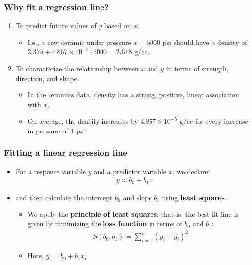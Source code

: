 \documentclass[handout]{beamer}\usepackage[]{graphicx}\usepackage[]{color}
\providecommand{\wh}[1]{\widehat{#1}}
\numberwithin{equation}{section}
\begin{document}
\begin{frame}
\frametitle{Why fit a regression line?}
\begin{enumerate}[1. ]
\item To predict future values of $y$ based on $x$.
\begin{itemize}
\pause \item I.e., a new ceramic under pressure $x = 5000$ psi should have a density of $2.375 + 4.867 \times 10^{-5} \cdot 5000 = 2.618$ g/cc. 
\end{itemize}
\pause \item To characterize the relationship between $x$ and $y$ in terms of strength, direction, and shape.
\begin{itemize}
\pause \item In the ceramics data, density has a strong, positive, linear association with $x$. 
\pause \item On average, the density increases by $4.867 \times 10^{-5}$ g/cc for every increase in pressure of 1 psi.
\end{itemize}
\end{enumerate}
\end{frame}

\begin{frame}
\frametitle{Fitting a linear regression line}
\begin{itemize}
\item For a response variable $y$ and a predictor variable $x$, we declare:
\begin{align*}
y \approx b_0 + b_1 x
\end{align*}
\pause \item and then calculate the intercept $b_0$ and slope $b_1$ using {\bf least squares}.
\begin{itemize}
\pause \item We apply the {\bf principle of least squares}: that is, the best-fit line is given by minimizing the {\bf loss function} in terms of $b_0$ and $b_1$:
\pause \begin{align*}
S(b_0, b_1) = \sum_{i = 1}^n (y_i - \wh{y}_i)^2
\end{align*} 
\item Here, $\wh{y}_i  = b_0 + b_1 x_i$
\end{itemize}
\end{itemize}
\end{frame}
\end{document}
